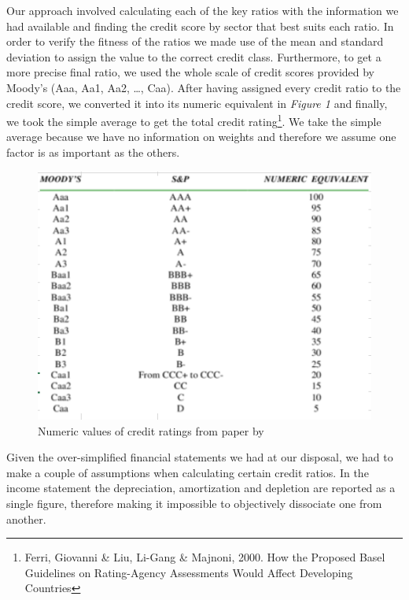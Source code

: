 \documentclass[
]{article}
\begin{document}
Our approach involved calculating each of the key ratios with the
information we had available and finding the credit score by sector that
best suits each ratio. In order to verify the fitness of the ratios we
made use of the mean and standard deviation to assign the value to the
correct credit class. Furthermore, to get a more precise final ratio, we
used the whole scale of credit scores provided by Moody's (Aaa, Aa1,
Aa2, \ldots, Caa). After having assigned every credit ratio to the
credit score, we converted it into its numeric equivalent in
\emph{Figure 1} and finally, we took the simple average to get the total
credit rating\footnote{Ferri, Giovanni \& Liu, Li-Gang \& Majnoni, 2000.
  How the Proposed Basel Guidelines on Rating-Agency Assessments Would
  Affect Developing Countries}. We take the simple average because we
have no information on weights and therefore we assume one factor is as
important as the others.

\begin{figure}
\centering
\includegraphics{"figure1.png"}
\caption{Numeric values of credit ratings from paper by}
\end{figure}

Given the over-simplified financial statements we had at our disposal,
we had to make a couple of assumptions when calculating certain credit
ratios. In the income statement the depreciation, amortization and
depletion are reported as a single figure, therefore making it
impossible to objectively dissociate one from another.
\end{document}
